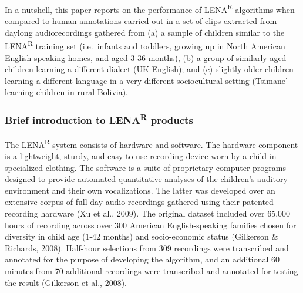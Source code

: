 \documentclass[english,table,man,floatsintext]{apa6}
\begin{document}
In a nutshell, this paper reports on the performance of LENA\textsuperscript{R} algorithms when compared to human annotations carried out in a set of clips extracted from daylong audiorecordings gathered from (a) a sample of children similar to the LENA\textsuperscript{R} training set (i.e.~infants and toddlers, growing up in North American English-speaking homes, and aged 3-36 months), (b) a group of similarly aged children learning a different dialect (UK English); and (c) slightly older children learning a different language in a very different sociocultural setting (Tsimane'-learning children in rural Bolivia).

\hypertarget{brief-introduction-to-lenar-products}{%
\subsubsection{\texorpdfstring{Brief introduction to LENA\textsuperscript{R} products}{Brief introduction to LENAR products}}\label{brief-introduction-to-lenar-products}}

The LENA\textsuperscript{R} system consists of hardware and software. The hardware component is a lightweight, sturdy, and easy-to-use recording device worn by a child in specialized clothing. The software is a suite of proprietary computer programs designed to provide automated quantitative analyses of the children's auditory environment and their own vocalizations. The latter was developed over an extensive corpus of full day audio recordings gathered using their patented recording hardware (Xu et al., 2009). The original dataset included over 65,000 hours of recording across over 300 American English-speaking families chosen for diversity in child age (1-42 months) and socio-economic status (Gilkerson \& Richards, 2008). Half-hour selections from 309 recordings were transcribed and annotated for the purpose of developing the algorithm, and an additional 60 minutes from 70 additional recordings were transcribed and annotated for testing the result (Gilkerson et al., 2008).
\end{document}
